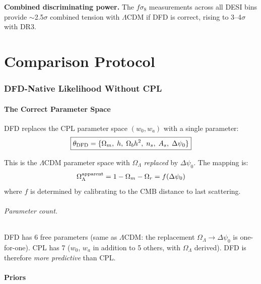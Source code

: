 \documentclass[11pt,a4paper]{article}
\newcommand{\LCDM}{$\Lambda$CDM}
\begin{document}
\textbf{Combined discriminating power.} The $f\sigma_8$ measurements
across all DESI bins provide $\sim$2.5$\sigma$ combined tension with
\LCDM{} if DFD is correct, rising to 3--4$\sigma$ with DR3.


\part{Comparison Protocol}
\label{part:comparison}

\section{DFD-Native Likelihood Without CPL}
\label{sec:likelihood}

\subsection{The Correct Parameter Space}

DFD replaces the CPL parameter space $(w_0, w_a)$ with a single
parameter:
\begin{equation}
\boxed{
\theta_{\rm DFD} = \{\Omega_m,\; h,\; \Omega_b h^2,\; n_s,\; A_s,\;
\Delta\psi_0\}
}
\end{equation}

This is the \LCDM{} parameter space with $\Omega_\Lambda$ \emph{replaced}
by $\Delta\psi_0$. The mapping is:
\begin{equation}
\Omega_\Lambda^{\rm apparent} = 1 - \Omega_m - \Omega_r
= f(\Delta\psi_0)
\end{equation}
where $f$ is determined by calibrating to the CMB distance to last
scattering.

\paragraph{Parameter count.} DFD has 6 free parameters (same as
\LCDM{}: the replacement $\Omega_\Lambda \to \Delta\psi_0$ is
one-for-one). CPL has 7 ($w_0$, $w_a$ in addition to 5 others,
with $\Omega_\Lambda$ derived). DFD is therefore \emph{more predictive}
than CPL.

\subsection{Priors}
\end{document}
